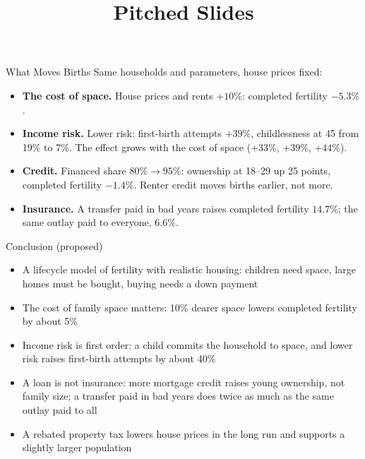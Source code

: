
\title{Pitched Slides}

\begin{frame}{What Moves Births}
\small
Same households and parameters, house prices fixed:
\begin{itemize}\setlength\itemsep{0.7em}
  \item \textbf{The cost of space.} House prices and rents $+10\%$: completed fertility $-5.3\%$.
  \item \textbf{Income risk.} Lower risk: first-birth attempts $+39\%$, childlessness at 45 from 19\% to 7\%. The effect grows with the cost of space ($+33\%$, $+39\%$, $+44\%$).
  \item \textbf{Credit.} Financed share $80\%\to95\%$: ownership at 18--29 up 25 points, completed fertility $-1.4\%$. Renter credit moves births earlier, not more.
  \item \textbf{Insurance.} A transfer paid in bad years raises completed fertility $14.7\%$; the same outlay paid to everyone, $6.6\%$.
\end{itemize}
\end{frame}

\begin{frame}{Conclusion (proposed)}
\begin{itemize}\setlength\itemsep{1.0em}
  \item A lifecycle model of fertility with realistic housing: children need space, large homes must be bought, buying needs a down payment
  \item The cost of family space matters: 10\% dearer space lowers completed fertility by about 5\%
  \item Income risk is first order: a child commits the household to space, and lower risk raises first-birth attempts by about 40\%
  \item A loan is not insurance: more mortgage credit raises young ownership, not family size; a transfer paid in bad years does twice as much as the same outlay paid to all
  \item A rebated property tax lowers house prices in the long run and supports a slightly larger population
\end{itemize}
\end{frame}

